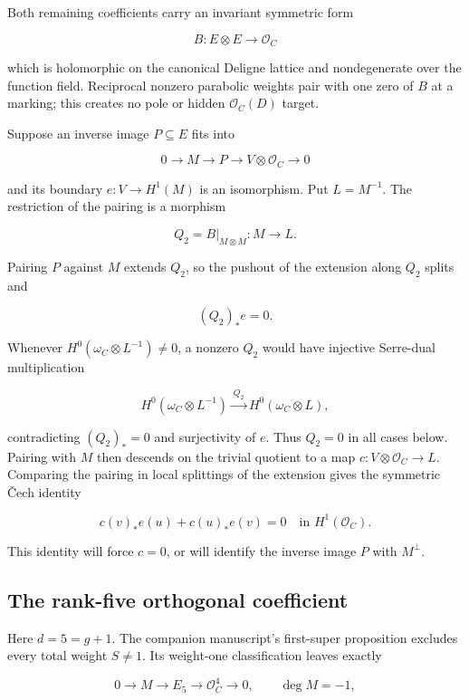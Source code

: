 \documentclass[11pt]{article}
\theoremstyle{definition}
\begin{document}
Both remaining coefficients carry an invariant symmetric form

\[B:E\otimes E\longrightarrow\mathcal O_C\]

which is holomorphic on the canonical Deligne lattice and nondegenerate
over the function field. Reciprocal nonzero parabolic weights pair with
one zero of \(B\) at a marking; this creates no pole or hidden
\(\mathcal O_C(D)\) target.

Suppose an inverse image \(P\subseteq E\) fits into

\[0\longrightarrow M\longrightarrow P
\longrightarrow V\otimes\mathcal O_C\longrightarrow0\]

and its boundary \(e:V\to H^1(M)\) is an isomorphism. Put \(L=M^{-1}\).
The restriction of the pairing is a morphism

\[Q_2=B|_{M\otimes M}:M\longrightarrow L.\]

Pairing \(P\) against \(M\) extends \(Q_2\), so the pushout of the
extension along \(Q_2\) splits and

\[(Q_2)_*e=0.\]

Whenever \(H^0(\omega_C\otimes L^{-1})\ne0\), a nonzero \(Q_2\) would
have injective Serre-dual multiplication

\[H^0(\omega_C\otimes L^{-1})
\xrightarrow{\,Q_2\,}H^0(\omega_C\otimes L),\]

contradicting \((Q_2)_*=0\) and surjectivity of \(e\). Thus \(Q_2=0\) in
all cases below. Pairing with \(M\) then descends on the trivial
quotient to a map \(c:V\otimes\mathcal O_C\to L\). Comparing the pairing
in local splittings of the extension gives the symmetric \v{C}ech identity

\[c(v)_*e(u)+c(u)_*e(v)=0
\quad\text{in }H^1(\mathcal O_C).\]

This identity will force \(c=0\), or will identify the inverse image
\(P\) with \(M^\perp\).

\subsection{The rank-five orthogonal
coefficient}\label{the-rank-five-orthogonal-coefficient}

Here \(d=5=g+1\). The companion manuscript's first-super
proposition \cite{SneidermanG5} excludes every total weight \(S\ne1\). Its weight-one
classification leaves exactly

\[0\longrightarrow M\longrightarrow E_5
\longrightarrow\mathcal O_C^4\longrightarrow0,
\qquad \deg M=-1,\]
\end{document}
